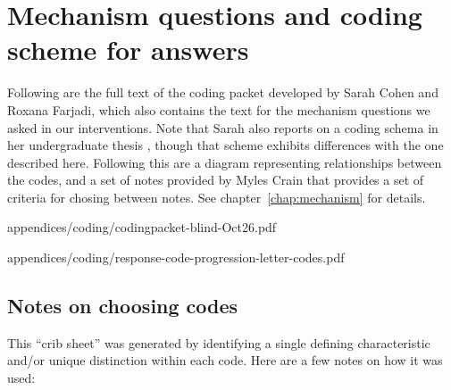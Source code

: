 \chapter{Mechanism questions and coding scheme for answers}

Following are the full text of the coding packet developed by Sarah Cohen and
Roxana Farjadi, which also contains the text for the mechanism questions we
asked in our interventions. Note that Sarah also reports on a coding schema in
her undergraduate thesis \cite{cohen-thesis}, though that scheme exhibits
differences with the one described here. Following this are a diagram
representing relationships between the codes, and a set of notes provided by
Myles Crain that provides a set of criteria for chosing between notes. See
chapter~\ref{chap:mechanism} for details.

           {appendices/coding/codingpacket-blind-Oct26.pdf}


           {appendices/coding/response-code-progression-letter-codes.pdf}



\section{Notes on choosing codes}

This “crib sheet” was generated by identifying a single defining characteristic
and/or unique distinction within each code. Here are a few notes on how it was
used:

